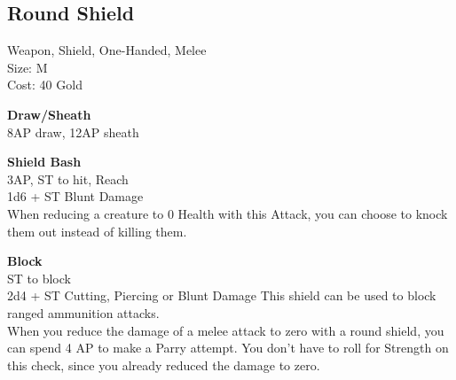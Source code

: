 \subsection{Round Shield}\label{weapon:roundShield}
Weapon, Shield, One-Handed, Melee\\
Size: M\\
Cost: 40 Gold

\textbf{Draw/Sheath}\\
8AP draw, 12AP sheath

\textbf{Shield Bash}\\
3AP, ST to hit,  Reach\\
1d6 + \texttimes ST Blunt Damage\\
When reducing a creature to 0 Health with this Attack, you can choose to knock them out instead of killing them.

\textbf{Block}\\
ST to block\\
2d4 + \texttimes ST Cutting, Piercing or Blunt Damage
This shield can be used to block ranged ammunition attacks.\\
When you reduce the damage of a melee attack to zero with a round shield, you can spend 4 AP to make a Parry attempt.
You don't have to roll for Strength on this check, since you already reduced the damage to zero.\\
